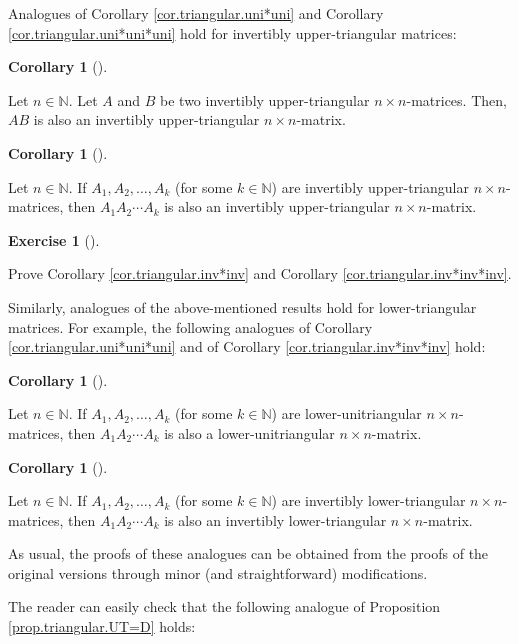 \documentclass[numbers=enddot,12pt,final,onecolumn,notitlepage]{scrartcl}%
\theoremstyle{definition}
\newtheorem{coro}[theo]{Corollary}
\newenvironment{corollary}[1][]
{\begin{coro}[#1]\begin{leftbar}}
{\end{leftbar}\end{coro}}
\newtheorem{exmp}[theo]{Exercise}
\newenvironment{exercise}[1][]
{\begin{exmp}[#1]\begin{leftbar}}
{\end{leftbar}\end{exmp}}
\begin{document}
Analogues of Corollary \ref{cor.triangular.uni*uni} and Corollary
\ref{cor.triangular.uni*uni*uni} hold for invertibly upper-triangular matrices:

\begin{corollary}
\label{cor.triangular.inv*inv}Let $n\in\mathbb{N}$. Let $A$ and $B$ be two
invertibly upper-triangular $n\times n$-matrices. Then, $AB$ is also an
invertibly upper-triangular $n\times n$-matrix.
\end{corollary}

\begin{corollary}
\label{cor.triangular.inv*inv*inv}Let $n\in\mathbb{N}$. If $A_{1},A_{2}%
,\ldots,A_{k}$ (for some $k\in\mathbb{N}$) are invertibly upper-triangular
$n\times n$-matrices, then $A_{1}A_{2}\cdots A_{k}$ is also an invertibly
upper-triangular $n\times n$-matrix.
\end{corollary}

\begin{exercise}
\label{exe.cor.triangular.inv*inv}Prove Corollary \ref{cor.triangular.inv*inv}
and Corollary \ref{cor.triangular.inv*inv*inv}.
\end{exercise}

Similarly, analogues of the above-mentioned results hold for lower-triangular
matrices. For example, the following analogues of Corollary
\ref{cor.triangular.uni*uni*uni} and of Corollary
\ref{cor.triangular.inv*inv*inv} hold:

\begin{corollary}
\label{cor.triangular.uni*uni*uni.lower}Let $n\in\mathbb{N}$. If $A_{1}%
,A_{2},\ldots,A_{k}$ (for some $k\in\mathbb{N}$) are lower-unitriangular
$n\times n$-matrices, then $A_{1}A_{2}\cdots A_{k}$ is also a
lower-unitriangular $n\times n$-matrix.
\end{corollary}

\begin{corollary}
\label{cor.triangular.inv*inv*inv.lower}Let $n\in\mathbb{N}$. If $A_{1}%
,A_{2},\ldots,A_{k}$ (for some $k\in\mathbb{N}$) are invertibly
lower-triangular $n\times n$-matrices, then $A_{1}A_{2}\cdots A_{k}$ is also
an invertibly lower-triangular $n\times n$-matrix.
\end{corollary}

As usual, the proofs of these analogues can be obtained from the proofs of the
original versions through minor (and straightforward) modifications.

The reader can easily check that the following analogue of Proposition
\ref{prop.triangular.UT=D} holds:
\end{document}
